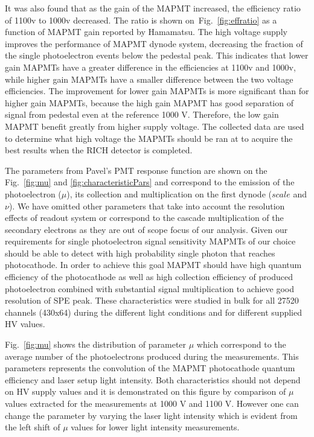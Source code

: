 It was also found that as the gain of the MAPMT increased, the efficiency ratio of 1100v to 1000v decreased.
The ratio is shown on~Fig.~\ref{fig:effratio} as a function of MAPMT gain reported by Hamamatsu.
The high voltage supply improves the performance of MAPMT dynode system, decreasing the fraction of the single photoelectron events below the pedestal peak.
This indicates that lower gain MAPMTs have a greater difference in the efficiencies at 1100v and 1000v, while higher gain MAPMTs have a smaller difference between the two voltage efficiencies.
The improvement for lower gain MAPMTs is more significant than for higher gain MAPMTs, because the high gain MAPMT has good separation of signal from pedestal even at the reference 1000 V.
Therefore, the low gain MAPMT benefit greatly from higher supply voltage.
The collected data are used to determine what high voltage the MAPMTs should be ran at to acquire the best results when the RICH detector is completed.


The parameters from Pavel's PMT response function are shown on the Fig.~\ref{fig:mu} and \ref{fig:characteristicPars} and correspond to the emission of the photoelectron ($\mu$), its collection and multiplication on the first dynode ($scale$ and $\nu$).
We have omitted other parameters that take into account the resolution effects of readout system or correspond to the cascade multiplication of the secondary electrons as they are out of scope focus of our analysis.
Given our requirements for single photoelectron signal sensitivity MAPMTs of our choice should be able to detect with high probability single photon that reaches photocathode.
In order to achieve this goal MAPMT should have high quantum efficiency of the photocathode as well as high collection efficiency of produced photoelectron combined with substantial signal multiplication to achieve good resolution of SPE peak.
These characteristics were studied in bulk for all 27520 channels (430x64) during the different light conditions and for different supplied HV values.


Fig.~\ref{fig:mu} shows the distribution of parameter $\mu$ which correspond to the average number of the photoelectrons produced during the measurements.
This parameters represents the convolution of the MAPMT photocathode quantum efficiency and laser setup light intensity.
Both characteristics should not depend on HV supply values and it is demonstrated on this figure by comparison of $\mu$ values extracted for the measurements at 1000 V and 1100 V.
However one can change the parameter by varying the laser light intensity which is evident from the left shift of $\mu$ values for lower light intensity measurements.

